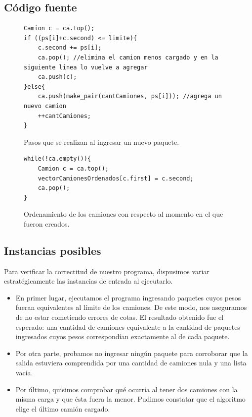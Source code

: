\subsection{Código fuente}

\begin{figure}[H]
\begin{center}
\begin{verbatim}
Camion c = ca.top();
if ((ps[i]+c.second) <= limite){
    c.second += ps[i];
    ca.pop(); //elimina el camion menos cargado y en la siguiente linea lo vuelve a agregar
    ca.push(c);
}else{
    ca.push(make_pair(cantCamiones, ps[i])); //agrega un nuevo camion
    ++cantCamiones;
}
\end{verbatim}
\caption{Pasos que se realizan al ingresar un nuevo paquete.}
\end{center}
\end{figure}

\begin{figure}[H]
\begin{center}
\begin{verbatim}
while(!ca.empty()){
	Camion c = ca.top();
	vectorCamionesOrdenados[c.first] = c.second;
	ca.pop();
}
\end{verbatim}
\caption{Ordenamiento de los camiones con respecto al momento en el que fueron creados.}
\end{center}
\end{figure}

\subsection{Instancias posibles}
Para verificar la correctitud de nuestro programa, dispusimos variar estratégicamente las instancias de entrada al ejecutarlo.
\begin{itemize}
\item En primer lugar, ejecutamos el programa ingresando paquetes cuyos pesos fueran equivalentes al límite de los camiones. De este modo, nos aseguramos de no estar cometiendo errores de cotas. El resultado obtenido fue el esperado: una cantidad de camiones equivalente a la cantidad de paquetes ingresados cuyos pesos correspondían exactamente al de cada paquete.

\item Por otra parte, probamos no ingresar ningún paquete para corroborar que la salida estuviera comprendida por una cantidad de camiones nula y una lista vacía.

\item Por último, quisimos comprobar qué ocurría al tener dos camiones con la misma carga y que ésta fuera la menor. Pudimos constatar que el algoritmo elige el último camión cargado.
\end{itemize}

